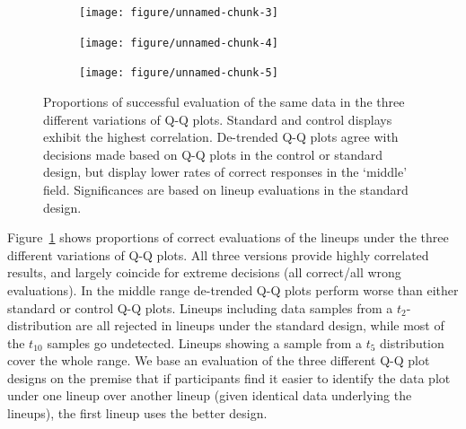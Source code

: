 \documentclass{article}\usepackage[]{graphicx}\usepackage[]{color}
\newenvironment{knitrout}{}{} %
\newcommand{\hh}[1]{{\color{magenta} #1}}
\begin{document}
\begin{figure}
\centering
\begin{subfigure}[b]{.3\textwidth}
\begin{knitrout}
\color{fgcolor}
\texttt{[image: figure/unnamed-chunk-3]} 

\end{knitrout}
\end{subfigure}
\begin{subfigure}[b]{.3\textwidth}
\begin{knitrout}
\color{fgcolor}
\texttt{[image: figure/unnamed-chunk-4]} 

\end{knitrout}
\end{subfigure}
\begin{subfigure}[b]{.3\textwidth}
\begin{knitrout}
\color{fgcolor}
\texttt{[image: figure/unnamed-chunk-5]} 

\end{knitrout}
\end{subfigure}
\caption{\label{fig:compare}Proportions of successful evaluation of the same data in the three different variations of Q-Q plots. Standard and control displays exhibit the highest correlation. De-trended Q-Q plots agree with decisions made based on Q-Q plots in the control or standard design, but display lower rates of correct responses in the `middle' field. Significances are based on lineup evaluations in the standard design. }
\end{figure}



Figure~\ref{fig:compare} shows proportions of correct evaluations of the lineups under the three different variations of Q-Q plots. All three versions provide highly correlated results, and largely coincide for extreme decisions (all correct/all wrong evaluations). In the middle range de-trended Q-Q plots perform  worse than either standard or control Q-Q plots. Lineups including data samples from a $t_2$-distribution  are all rejected in lineups under the standard design, while most of the $t_{10}$ samples go undetected. Lineups showing a sample from a $t_5$ distribution cover the whole range.
\hh{We base an evaluation of the three different Q-Q plot designs on the premise that if participants find it easier to identify the data plot under one lineup over another lineup (given identical data underlying the lineups), the first lineup uses the better design.}
\end{document}
